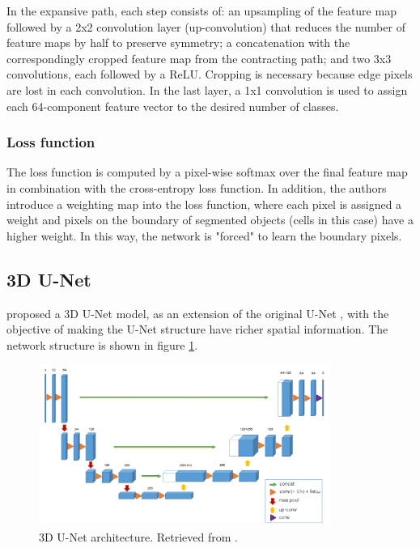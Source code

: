 In the expansive path, each step consists of: an upsampling of the feature map followed by a 2x2 convolution layer (up-convolution) that reduces the number of feature maps by half to preserve symmetry; a concatenation with the correspondingly cropped feature map from the contracting path; and two 3x3 convolutions, each followed by a \ac{ReLU}. Cropping is necessary because edge pixels are lost in each convolution. In the last layer, a 1x1 convolution is used to assign each 64-component feature vector to the desired number of classes.


\subsubsection*{Loss function}

The loss function is computed by a pixel-wise softmax over the final feature map in combination with the cross-entropy loss function. In addition, the authors introduce a weighting map into the loss function, where each pixel is assigned a weight and pixels on the boundary of segmented objects (cells in this case) have a higher weight. In this way, the network is "forced" to learn the boundary pixels.

\subsection{3D U-Net}
\label{subsection:3dunet}

\citet{Unet:3D} proposed a \ac{3D} U-Net model, as an extension of the original U-Net \cite{Unet:2D}, with the objective of making the U-Net structure have richer spatial information. The network structure is shown in figure \ref{fig:3dUnet}. 

\begin{figure}[!htb]
  \centering
  \includegraphics[width=0.85\textwidth]{Images/3dunet.jpg}
  \caption[\ac{3D} U-Net architecture.]{\ac{3D} U-Net architecture. Retrieved from \cite{Unet:3D}.}
  \label{fig:3dUnet}
\end{figure}

